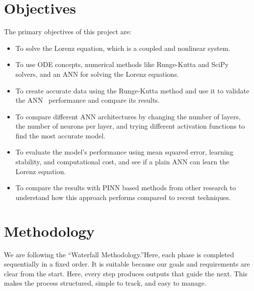 \section{Objectives}
The primary objectives of this project are:

\begin{itemize}
    \item To solve the Lorenz equation, which is a coupled and nonlinear system.
\end{itemize}

\begin{itemize}
    \item To use ODE concepts, numerical methods like Runge-Kutta and SciPy solvers, and an ANN for solving the Lorenz equations.
\end{itemize}

\begin{itemize}
    \item To create accurate data using the Runge-Kutta method and use it to validate the ANN  performance and compare its results.
\end{itemize}

\begin{itemize}
    \item To compare different ANN architectures by changing the number of layers, the number of neurons per layer, and trying different activation functions to find the most accurate model.
\end{itemize}

\begin{itemize}
    \item To evaluate the model’s performance using mean squared error, learning stability, and computational cost, and see if a plain ANN can learn the Lorenz equation.
\end{itemize}

\begin{itemize}
    \item To compare the results with PINN based methods from other research to understand how this approach performs compared to recent techniques.
\end{itemize}


\section{Methodology}
We are following the “Waterfall Methodology.”Here, each phase is completed sequentially in a fixed order. It is suitable because our goals and requirements are clear from the start. Here, every step produces outputs that guide the next. This makes the process structured, simple to track, and easy to manage.

